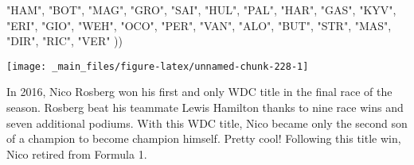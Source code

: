 \documentclass[
]{book}
\newenvironment{Shaded}{\begin{snugshade}}{\end{snugshade}}
\newcommand{\NormalTok}[1]{#1}
\newcommand{\StringTok}[1]{\textcolor[rgb]{0.31,0.60,0.02}{#1}}
\begin{document}
\begin{Shaded}
\begin{Highlighting}[]
                                \StringTok{"HAM"}\NormalTok{, }\StringTok{"BOT"}\NormalTok{,}
                                \StringTok{"MAG"}\NormalTok{, }\StringTok{"GRO"}\NormalTok{,}
                                \StringTok{"SAI"}\NormalTok{, }\StringTok{"HUL"}\NormalTok{, }\StringTok{"PAL"}\NormalTok{,}
                                \StringTok{"HAR"}\NormalTok{, }\StringTok{"GAS"}\NormalTok{, }\StringTok{"KYV"}\NormalTok{,}
                                \StringTok{"ERI"}\NormalTok{, }\StringTok{"GIO"}\NormalTok{, }\StringTok{"WEH"}\NormalTok{,}
                                \StringTok{"OCO"}\NormalTok{, }\StringTok{"PER"}\NormalTok{,  }
                                \StringTok{"VAN"}\NormalTok{, }\StringTok{"ALO"}\NormalTok{, }\StringTok{"BUT"}\NormalTok{,}
                                \StringTok{"STR"}\NormalTok{, }\StringTok{"MAS"}\NormalTok{, }\StringTok{"DIR"}\NormalTok{,}
                                \StringTok{"RIC"}\NormalTok{, }\StringTok{"VER"}
\NormalTok{                                )) }
\end{Highlighting}
\end{Shaded}

\begin{center}\texttt{[image: \_main\_files/figure-latex/unnamed-chunk-228-1]} \end{center}

In 2016, Nico Rosberg won his first and only WDC title in the final race of the season. Rosberg beat his teammate Lewis Hamilton thanks to nine race wins and seven additional podiums. With this WDC title, Nico became only the second son of a champion to become champion himself. Pretty cool! Following this title win, Nico retired from Formula 1.
\end{document}

